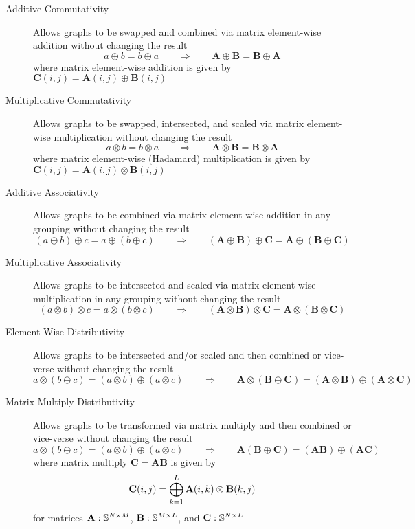 \begin{description}
\item[Additive Commutativity] Allows graphs to be swapped and combined via matrix element-wise addition without changing the result
  $$
      a \oplus b = b \oplus a  ~~~~~~~~~ \Rightarrow ~~~~~~~~~
      \mathbf{A} \oplus \mathbf{B} = \mathbf{B} \oplus \mathbf{A}
  $$
  where matrix element-wise addition is given by
     $\mathbf{C}(i,j) = \mathbf{A}(i,j) \oplus \mathbf{B}(i,j)$
     
\item[Multiplicative Commutativity] Allows graphs to be swapped, intersected, and scaled via matrix element-wise multiplication without changing the result
  $$
      a \otimes b = b \otimes a  ~~~~~~~~~ \Rightarrow ~~~~~~~~~
      \mathbf{A} \otimes \mathbf{B} = \mathbf{B} \otimes \mathbf{A}
  $$
    where matrix element-wise (Hadamard) multiplication is given by
     $\mathbf{C}(i,j) = \mathbf{A}(i,j) \otimes \mathbf{B}(i,j)$

\item[Additive Associativity] Allows graphs to be combined via matrix element-wise addition in any grouping without changing the result
  $$
      (a \oplus b) \oplus c = a \oplus (b \oplus c)   ~~~~~~~~~ \Rightarrow ~~~~~~~~~
      (\mathbf{A} \oplus \mathbf{B}) \oplus \mathbf{C} = \mathbf{A} \oplus (\mathbf{B} \oplus \mathbf{C})
  $$

\item[Multiplicative Associativity] Allows graphs to be intersected and scaled via matrix element-wise multiplication in any grouping without changing the result
  $$
      (a \otimes b) \otimes c = a \otimes (b \otimes c)   ~~~~~~~~~ \Rightarrow ~~~~~~~~~
      (\mathbf{A} \otimes \mathbf{B}) \otimes \mathbf{C} = \mathbf{A} \otimes (\mathbf{B} \otimes \mathbf{C})
  $$

\item[Element-Wise Distributivity] Allows graphs to be intersected and/or scaled and then combined or vice-verse without changing the result
  $$
      a \otimes (b \oplus c) = (a \otimes b) \oplus (a \otimes c)   ~~~~~~~~~ \Rightarrow ~~~~~~~~~
      \mathbf{A} \otimes (\mathbf{B} \oplus \mathbf{C}) = (\mathbf{A} \otimes \mathbf{B}) \oplus (\mathbf{A} \otimes \mathbf{C})
  $$

\item[Matrix Multiply Distributivity] Allows graphs to be transformed via matrix multiply and then combined or vice-verse without changing the result
  $$
      a \otimes (b \oplus c) = (a \otimes b) \oplus (a \otimes c)   ~~~~~~~~~ \Rightarrow ~~~~~~~~~
      \mathbf{A} (\mathbf{B} \oplus \mathbf{C}) = (\mathbf{A} \mathbf{B}) \oplus (\mathbf{A} \mathbf{C})
  $$
  where matrix multiply $\mathbf{C} = \mathbf{A} \mathbf{B}$ is given by
  $$
   {\bf C}(i,j) = \bigoplus_{k=1}^L {\bf A}(i,k) \otimes {\bf B}(k,j)
  $$
  for matrices  ${\bf A}: \mathbb{S}^{N \times M}$,  ${\bf B}: \mathbb{S}^{M \times L}$, and ${\bf C}: \mathbb{S}^{N \times L}$


\end{description}
